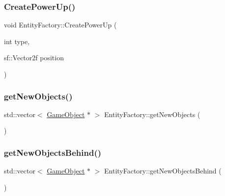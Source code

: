 \hypertarget{class_entity_factory_a3d50f46ea571447791681e0799fe7056}{}\label{class_entity_factory_a3d50f46ea571447791681e0799fe7056} 
\subsubsection{\texorpdfstring{Create\+Power\+Up()}{CreatePowerUp()}}
{\footnotesize\ttfamily void Entity\+Factory\+::\+Create\+Power\+Up (\begin{DoxyParamCaption}\item[{int}]{type,  }\item[{sf\+::\+Vector2f}]{position }\end{DoxyParamCaption})\hspace{0.3cm}{\ttfamily [static]}}

\hypertarget{class_entity_factory_ab67a24301fabebc078f219c7e9e8c4fb}{}\label{class_entity_factory_ab67a24301fabebc078f219c7e9e8c4fb} 
\subsubsection{\texorpdfstring{get\+New\+Objects()}{getNewObjects()}}
{\footnotesize\ttfamily std\+::vector$<$ \hyperlink{class_game_object}{Game\+Object} $\ast$ $>$ Entity\+Factory\+::get\+New\+Objects (\begin{DoxyParamCaption}{ }\end{DoxyParamCaption})\hspace{0.3cm}{\ttfamily [static]}}

\hypertarget{class_entity_factory_a01479e6b22f3db318007b1dbc4e85058}{}\label{class_entity_factory_a01479e6b22f3db318007b1dbc4e85058} 
\subsubsection{\texorpdfstring{get\+New\+Objects\+Behind()}{getNewObjectsBehind()}}
{\footnotesize\ttfamily std\+::vector$<$ \hyperlink{class_game_object}{Game\+Object} $\ast$ $>$ Entity\+Factory\+::get\+New\+Objects\+Behind (\begin{DoxyParamCaption}{ }\end{DoxyParamCaption})\hspace{0.3cm}{\ttfamily [static]}}

